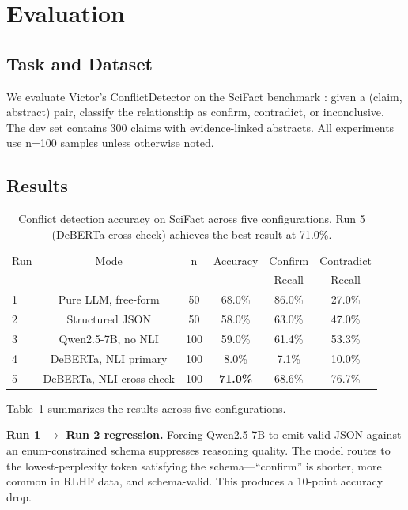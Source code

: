 \documentclass[letterpaper]{article}          %
\theoremstyle{plain}
\theoremstyle{definition}
\theoremstyle{remark}
\begin{document}

\section{Evaluation}

\subsection{Task and Dataset}

We evaluate Victor's ConflictDetector on the SciFact benchmark
\citep{wadden2020scifact}: given a (claim, abstract) pair, classify the
relationship as confirm, contradict, or inconclusive. The dev set contains 300
claims with evidence-linked abstracts. All experiments use n=100 samples unless
otherwise noted.

\subsection{Results}

\begin{table}[t]
\centering
\caption{Conflict detection accuracy on SciFact across five configurations.
Run 5 (DeBERTa cross-check) achieves the best result at 71.0\%.}
\label{tab:results}
\begin{tabular}{@{}lccccc@{}}
\toprule
Run & Mode & n & Accuracy & Confirm & Contradict \\
     &      &   &           & Recall   & Recall \\
\midrule
1 & Pure LLM, free-form & 50 & 68.0\% & 86.0\% & 27.0\% \\
2 & Structured JSON     & 50 & 58.0\% & 63.0\% & 47.0\% \\
3 & Qwen2.5-7B, no NLI & 100& 59.0\% & 61.4\% & 53.3\% \\
4 & DeBERTa, NLI primary& 100& 8.0\%  & 7.1\%  & 10.0\% \\
5 & DeBERTa, NLI cross-check & 100 & \textbf{71.0\%} & 68.6\% & 76.7\% \\
\bottomrule
\end{tabular}
\end{table}

Table~\ref{tab:results} summarizes the results across five configurations.

\textbf{Run 1 $\rightarrow$ Run 2 regression.} Forcing Qwen2.5-7B to emit valid
JSON against an enum-constrained schema suppresses reasoning quality. The model
routes to the lowest-perplexity token satisfying the schema---``confirm'' is
shorter, more common in RLHF data, and schema-valid. This produces a 10-point
accuracy drop.
\end{document}
